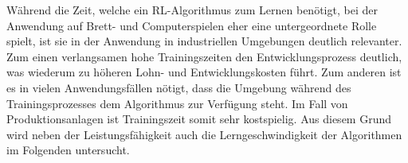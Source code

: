 Während die Zeit, welche ein RL-Algorithmus zum Lernen benötigt, bei der Anwendung auf Brett- und Computerspielen 
eher eine untergeordnete Rolle spielt, ist sie in der Anwendung in industriellen Umgebungen deutlich relevanter.
Zum einen verlangsamen hohe Trainingszeiten den Entwicklungsprozess deutlich, was wiederum zu höheren Lohn- und Entwicklungskosten führt. 
Zum anderen ist es in vielen Anwendungsfällen nötigt, dass die Umgebung während des Trainingsprozesses dem Algorithmus zur Verfügung steht. 
Im Fall von Produktionsanlagen ist Trainingszeit somit sehr kostspielig.
Aus diesem Grund wird neben der Leistungsfähigkeit auch die Lerngeschwindigkeit der Algorithmen im Folgenden untersucht.


\newpage